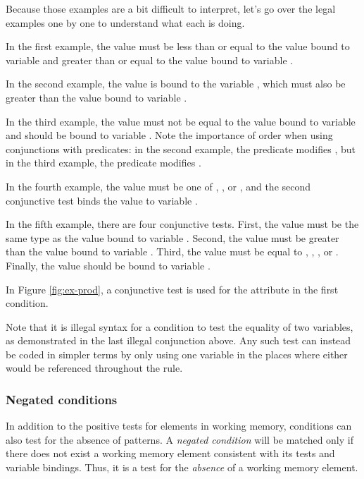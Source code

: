 Because those examples are a bit difficult to interpret, let's go over the
legal examples one by one to understand what each is doing.

In the first example, the value must be less than or equal to the value bound
to variable  and greater than or equal to the value bound to
variable .

In the second example, the value is bound to the variable , which
must also be greater than the value bound to variable . 

In the third example, the value must not be equal to the value bound to
variable  and should be bound to variable .  Note the
importance of order when using conjunctions with predicates: in the second
example, the predicate modifies , but in the third
example, the predicate modifies .

In the fourth example, the value must be one of , , or
, and the second conjunctive test binds the value to variable
. 

In the fifth example, there are four conjunctive tests. First, the value must
be the same type as the value bound to variable . Second, the value
must be greater than the value bound to variable . Third, the value
must be equal to , , , or . Finally, the value
should be bound to variable .

In Figure \ref{fig:ex-prod}, a conjunctive test is used for the 
attribute in the first condition.

Note that it is illegal syntax for a condition to test the equality of two variables, 
as demonstrated in the last illegal conjunction above. Any such test can instead be 
coded in simpler terms by only using one variable in the places where either would be 
referenced throughout the rule.

\subsubsection{Negated conditions}
\label{SYNTAX-pm-negated}       %
\index{-}

In addition to the positive tests for elements in working memory, conditions
can also test for the absence of patterns.  A \emph{negated condition} will be
matched only if there does not exist a working memory element consistent with
its tests and variable bindings. Thus, it is a test for the \textit{absence}
of a working memory element.

